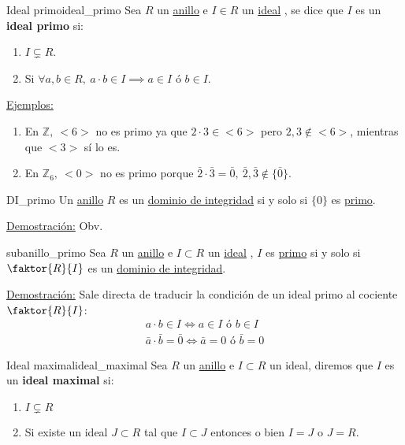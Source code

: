 \documentclass[10pt, a4paper]{article}
\newcommand{\Z}{\mathbb{Z}}
\newcommand{\ejs}{\underline{Ejemplos:} }
\newcommand{\demo}{\underline{Demostración:} }
\newcommand{\anillo}[1][]{\hyperref[def:anillo]{anillo}#1 }
\newcommand{\ideal}[1][]{\hyperref[def:ideal]{ideal}#1 }
\newenvironment{enumerater}{\begin{enumerate}[label=\roman*)]}
{\end{enumerate}}
\newenvironment{enumeratea}{\begin{enumerate}[label=\arabic*)]}
{\end{enumerate}}
\begin{document}
\begin{definition}{Ideal primo}{ideal_primo}
Sea $R$ un \anillo e $I \in R$ un \ideal, se dice que $I$ es un \textbf{ideal primo} si:
\begin{enumerater}
	\item $I \subsetneq R$.
	\item Si $\forall a,b \in R,\ a \cdot b \in I \implies a \in I \text{ ó } b \in I$.
\end{enumerater}
\end{definition}

\ejs
\begin{enumeratea}
	\item En $\Z,\ <6>$ no es primo ya que $2 \cdot 3 \in <6>$ pero $2,3 \notin <6>$, mientras que $<3>$ sí lo es.
	\item En $\Z_6,\ <0>$ no es primo porque $\bar{2} \cdot \bar{3} = \bar{0},\ \bar{2}, \bar{3} \notin \{\bar{0}\}$.
\end{enumeratea}

\begin{proposition}{}{DI_primo}
Un \anillo $R$ es un \hyperref[def:DI]{dominio de integridad} si y solo si $\{0\}$ es \hyperref[def:ideal_primo]{primo}.
\end{proposition}

\demo Obv.

\begin{proposition}{}{subanillo_primo}
Sea $R$ un \anillo e $I \subset R$ un \ideal, $I$ es \hyperref[def:ideal_primo]{primo} si y solo si $\faktor{R}{I}$ es un \hyperref[def:DI]{dominio de integridad}.
\end{proposition}

\demo Sale directa de traducir la condición de un ideal primo al cociente $\faktor{R}{I}$:
\[
\begin{array}{c}
	a \cdot b \in I \iff a \in I \text{ ó } b \in I \\
	\bar{a} \cdot \bar{b} = \bar{0} \iff \bar{a} = 0 \text{ ó } \bar{b} = 0
\end{array}
\]

\begin{definition}{Ideal maximal}{ideal_maximal}
Sea $R$ un \anillo e $I \subset R$ un ideal, diremos que $I$ es un \textbf{ideal maximal} si:
\begin{enumerater}
	\item $I \subsetneq R$
	\item Si existe un ideal $J \subset R$ tal que $I \subset J$ entonces o bien $I = J$ o $J = R$.
\end{enumerater}
\end{definition}
\end{document}
